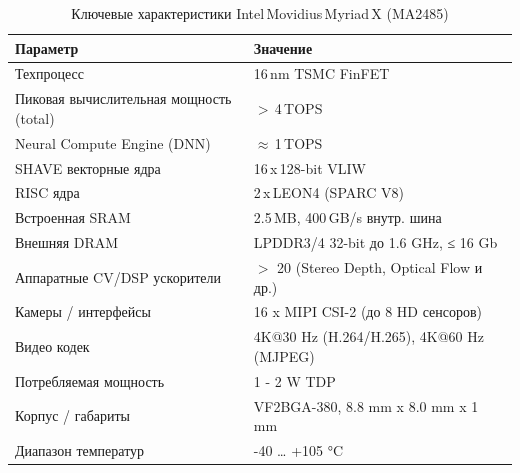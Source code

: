    \begin{table}[ht]
    \centering
    \caption{Ключевые характеристики Intel\,Movidius\,Myriad\,X (MA2485)}
    \label{tab:myriadx_specs}
        \begin{tabular}{|p{7.5cm}|p{7.5cm}|}
        \hline
        \textbf{Параметр}                       & \textbf{Значение} \\ \hline
        Техпроцесс                              & 16\,nm TSMC FinFET \\ \hline
        Пиковая вычислительная мощность (total) & $>$\,4\,TOPS \\ \hline
        Neural Compute Engine (DNN)             & $\approx$\,1\,TOPS \\ \hline
        SHAVE векторные ядра                    & 16\,x\,128-bit VLIW \\ \hline
        RISC ядра                               & 2\,x\,LEON4 (SPARC V8) \\ \hline
        Встроенная SRAM                         & 2.5\,MB, 400\,GB/s внутр. шина \\ \hline
        Внешняя DRAM                            & LPDDR3/4 32-bit до 1.6 GHz, ≤ 16 Gb \\ \hline
        Аппаратные CV/DSP ускорители            & $>$ 20 (Stereo Depth, Optical Flow и др.) \\  \hline
        Камеры / интерфейсы                     & 16 x MIPI CSI-2 (до 8 HD сенсоров) \\ \hline
        Видео кодек                             & 4K@30 Hz (H.264/H.265), 4K@60 Hz (MJPEG) \\   \hline
        Потребляемая мощность                   & 1 - 2 W TDP \\ \hline
        Корпус / габариты                       & VF2BGA-380, 8.8 mm x 8.0 mm x 1 mm \\ \hline
        Диапазон температур                     & -40 … +105 °C \\ \hline
        \end{tabular}
    \end{table}
